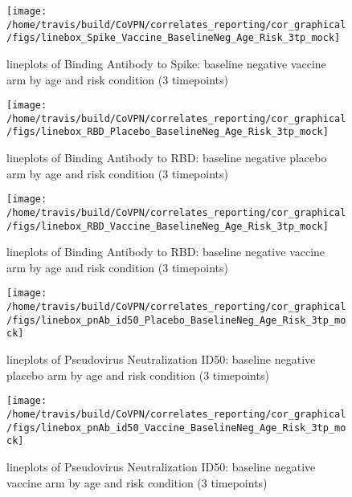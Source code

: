 \documentclass[]{book}
\theoremstyle{definition}
\theoremstyle{definition}
\theoremstyle{definition}
\newcommand{\1}{\mathbbm{1}}
\begin{document}
\clearpage
\begin{figure}[H]

{\centering \texttt{[image: /home/travis/build/CoVPN/correlates\_reporting/cor\_graphical/figs/linebox\_Spike\_Vaccine\_BaselineNeg\_Age\_Risk\_3tp\_mock]} 

}

\caption{lineplots of Binding Antibody to Spike: baseline negative vaccine arm by age and risk condition (3 timepoints)}\label{fig:unnamed-chunk-140}
\end{figure}

\clearpage
\begin{figure}[H]

{\centering \texttt{[image: /home/travis/build/CoVPN/correlates\_reporting/cor\_graphical/figs/linebox\_RBD\_Placebo\_BaselineNeg\_Age\_Risk\_3tp\_mock]} 

}

\caption{lineplots of Binding Antibody to RBD: baseline negative placebo arm by age and risk condition (3 timepoints)}\label{fig:unnamed-chunk-141}
\end{figure}

\clearpage
\begin{figure}[H]

{\centering \texttt{[image: /home/travis/build/CoVPN/correlates\_reporting/cor\_graphical/figs/linebox\_RBD\_Vaccine\_BaselineNeg\_Age\_Risk\_3tp\_mock]} 

}

\caption{lineplots of Binding Antibody to RBD: baseline negative vaccine arm by age and risk condition (3 timepoints)}\label{fig:unnamed-chunk-142}
\end{figure}

\clearpage
\begin{figure}[H]

{\centering \texttt{[image: /home/travis/build/CoVPN/correlates\_reporting/cor\_graphical/figs/linebox\_pnAb\_id50\_Placebo\_BaselineNeg\_Age\_Risk\_3tp\_mock]} 

}

\caption{lineplots of Pseudovirus Neutralization ID50: baseline negative placebo arm by age and risk condition (3 timepoints)}\label{fig:unnamed-chunk-143}
\end{figure}

\clearpage
\begin{figure}[H]

{\centering \texttt{[image: /home/travis/build/CoVPN/correlates\_reporting/cor\_graphical/figs/linebox\_pnAb\_id50\_Vaccine\_BaselineNeg\_Age\_Risk\_3tp\_mock]} 

}

\caption{lineplots of Pseudovirus Neutralization ID50: baseline negative vaccine arm by age and risk condition (3 timepoints)}\label{fig:unnamed-chunk-144}
\end{figure}
\end{document}
